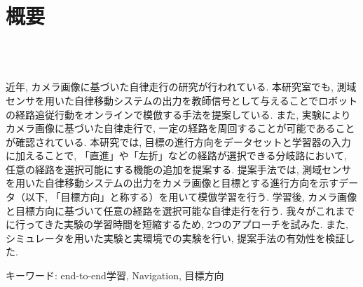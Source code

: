 \chapter*{概要}
\thispagestyle{empty}
%
\begin{center}
  \scalebox{1.5}{視覚と行動のend-to-end学習により}\\
  \scalebox{1.5}{経路追従行動をオンラインで模倣する手法の提案}\\
  \scalebox{1.5}{（目標方向による経路選択機能の追加と検証）}
\end{center}
\vspace{1.0zh}
%
\par
近年, カメラ画像に基づいた自律走行の研究が行われている. 本研究室でも, 測域センサを用いた自律移動システムの出力を教師信号として与えることでロボットの経路追従行動をオンラインで模倣する手法を提案している. また, 実験によりカメラ画像に基づいた自律走行で, 一定の経路を周回することが可能であることが確認されている. 本研究では, 目標の進行方向をデータセットと学習器の入力に加えることで, 「直進」や「左折」などの経路が選択できる分岐路において, 任意の経路を選択可能にする機能の追加を提案する. 提案手法では, 測域センサを用いた自律移動システムの出力をカメラ画像と目標とする進行方向を示すデータ（以下, 「目標方向」と称する）を用いて模倣学習を行う. 学習後, カメラ画像と目標方向に基づいて任意の経路を選択可能な自律走行を行う. 
我々がこれまでに行ってきた実験の学習時間を短縮するため, 2つのアプローチを試みた.
また, シミュレータを用いた実験と実環境での実験を行い, 提案手法の有効性を検証した. 

キーワード: end-to-end学習, Navigation, 目標方向
%
\newpage

